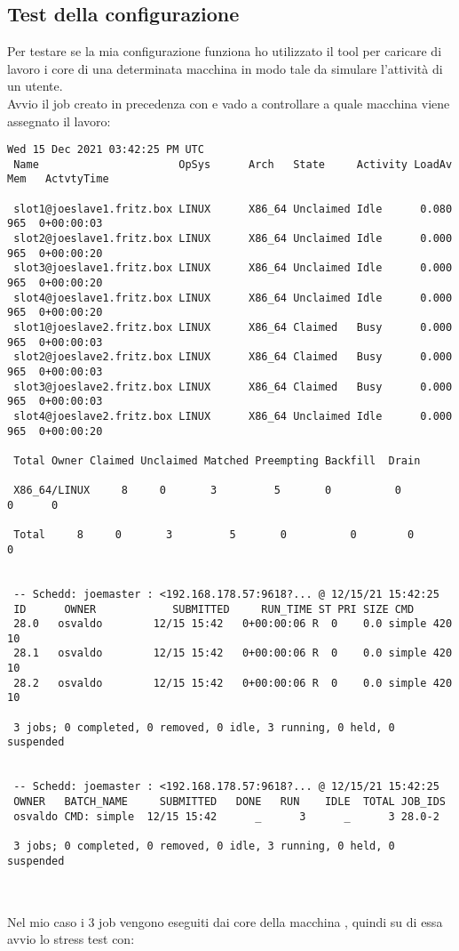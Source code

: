 \subsection{Test della configurazione}

Per testare se la mia configurazione funziona ho utilizzato il tool  per caricare di lavoro i core di una determinata macchina in modo tale da simulare l'attivit\`{a} di un utente.\\
Avvio il job creato in precedenza con  e vado a controllare a quale macchina viene assegnato il lavoro:

\begin{lstlisting}[style=output_tiny]
  Wed 15 Dec 2021 03:42:25 PM UTC
 Name                      OpSys      Arch   State     Activity LoadAv Mem   ActvtyTime
 
 slot1@joeslave1.fritz.box LINUX      X86_64 Unclaimed Idle      0.080  965  0+00:00:03
 slot2@joeslave1.fritz.box LINUX      X86_64 Unclaimed Idle      0.000  965  0+00:00:20
 slot3@joeslave1.fritz.box LINUX      X86_64 Unclaimed Idle      0.000  965  0+00:00:20
 slot4@joeslave1.fritz.box LINUX      X86_64 Unclaimed Idle      0.000  965  0+00:00:20
 slot1@joeslave2.fritz.box LINUX      X86_64 Claimed   Busy      0.000  965  0+00:00:03
 slot2@joeslave2.fritz.box LINUX      X86_64 Claimed   Busy      0.000  965  0+00:00:03
 slot3@joeslave2.fritz.box LINUX      X86_64 Claimed   Busy      0.000  965  0+00:00:03
 slot4@joeslave2.fritz.box LINUX      X86_64 Unclaimed Idle      0.000  965  0+00:00:20
 
 Total Owner Claimed Unclaimed Matched Preempting Backfill  Drain
 
 X86_64/LINUX     8     0       3         5       0          0        0      0
 
 Total     8     0       3         5       0          0        0      0
 
 
 -- Schedd: joemaster : <192.168.178.57:9618?... @ 12/15/21 15:42:25
 ID      OWNER            SUBMITTED     RUN_TIME ST PRI SIZE CMD
 28.0   osvaldo        12/15 15:42   0+00:00:06 R  0    0.0 simple 420 10
 28.1   osvaldo        12/15 15:42   0+00:00:06 R  0    0.0 simple 420 10
 28.2   osvaldo        12/15 15:42   0+00:00:06 R  0    0.0 simple 420 10
 
 3 jobs; 0 completed, 0 removed, 0 idle, 3 running, 0 held, 0 suspended
 
 
 -- Schedd: joemaster : <192.168.178.57:9618?... @ 12/15/21 15:42:25
 OWNER   BATCH_NAME     SUBMITTED   DONE   RUN    IDLE  TOTAL JOB_IDS
 osvaldo CMD: simple  12/15 15:42      _      3      _      3 28.0-2
 
 3 jobs; 0 completed, 0 removed, 0 idle, 3 running, 0 held, 0 suspended
 
\end{lstlisting}
\ \\
Nel mio caso i 3 job vengono eseguiti dai core  della macchina , quindi su di essa avvio lo stress test con:

